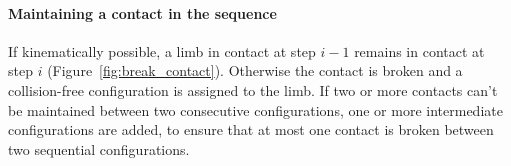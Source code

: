 \documentclass[journal]{IEEEtran}
\providecommand{\DIFdeltex}[1]{} %
\providecommand{\DIFaddbegin}{\protect\color{blue}} %
\providecommand{\DIFaddend}{\protect\color{black}} %
\providecommand{\DIFdelbegin}{\protect\cbdelete} %
\providecommand{\DIFdelend}{} %
\providecommand{\DIFdel}[1]{\texorpdfstring{\DIFdeltex{#1}}{}} %
\begin{document}


\paragraph{Maintaining a contact in the sequence}

If kinematically possible, a limb in contact at step $i-1$ remains in contact at step $i$ (Figure~\ref{fig:break_contact}). 
Otherwise the contact is broken and a collision-free configuration is assigned to the limb.
If two or more contacts can't be maintained between two consecutive configurations, one or more intermediate configurations are added, to ensure
that at most one contact is broken between two sequential configurations.
\end{document}
